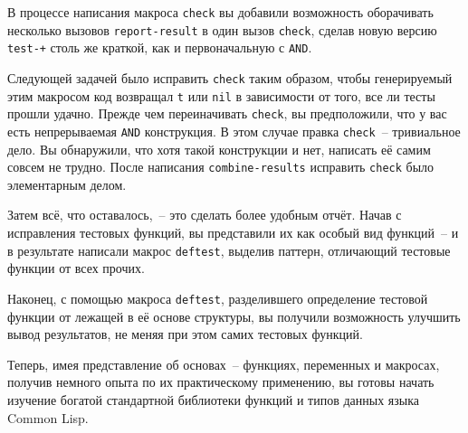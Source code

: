 В процессе написания макроса \lstinline{check} вы добавили возможность оборачивать несколько
вызовов \lstinline{report-result} в один вызов \lstinline{check}, сделав новую версию \lstinline{test-+}
столь же краткой, как и первоначальную с \lstinline{AND}.

Следующей задачей было исправить \lstinline{check} таким образом, чтобы генерируемый этим
макросом код возвращал \lstinline{t} или \lstinline{nil} в зависимости от того, все ли тесты прошли
удачно. Прежде чем переиначивать \lstinline{check}, вы предположили, что у вас есть
непрерываемая \lstinline{AND} конструкция. В этом случае правка \lstinline{check}~-- тривиальное
дело. Вы обнаружили, что хотя такой конструкции и нет, написать её самим совсем не
трудно. После написания \lstinline{combine-results} исправить \lstinline{check} было элементарным
делом.

Затем всё, что оставалось,~-- это сделать более удобным отчёт. Начав с исправления тестовых
функций, вы представили их как особый вид функций~-- и в результате написали макрос
\lstinline{deftest}, выделив паттерн, отличающий тестовые функции от всех прочих.

Наконец, с помощью макроса \lstinline{deftest}, разделившего определение тестовой функции от
лежащей в её основе структуры, вы получили возможность улучшить вывод результатов, не меняя
при этом самих тестовых функций.

Теперь, имея представление об основах~-- функциях, переменных и макросах, получив немного
опыта по их практическому применению, вы готовы начать изучение богатой стандартной
библиотеки функций и типов данных языка Common Lisp.

